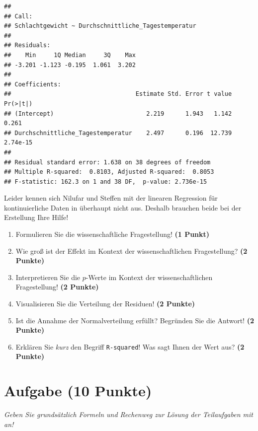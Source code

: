 \documentclass[a4paper, 9pt]{scrartcl}\usepackage[]{graphicx}\usepackage[]{xcolor}
\makeatletter
\newenvironment{kframe}{%
 \def\at@end@of@kframe{}%
 \ifinner\ifhmode%
  \def\at@end@of@kframe{\end{minipage}}%
  \begin{minipage}{\columnwidth}%
 \fi\fi%
 \def\FrameCommand##1{\hskip\@totalleftmargin \hskip-\fboxsep
 \colorbox{shadecolor}{##1}\hskip-\fboxsep
     \hskip-\linewidth \hskip-\@totalleftmargin \hskip\columnwidth}%
 \MakeFramed {\advance\hsize-\width
   \@totalleftmargin\z@ \linewidth\hsize
   \@setminipage}}%
 {\par\unskip\endMakeFramed%
 \at@end@of@kframe}
\newenvironment{knitrout}{}{} %
\makeatother
\begin{document}
\begin{knitrout}
\color{fgcolor}\begin{kframe}
\begin{verbatim}
## 
## Call:
## Schlachtgewicht ~ Durchschnittliche_Tagestemperatur
## 
## Residuals:
##    Min     1Q Median     3Q    Max 
## -3.201 -1.123 -0.195  1.061  3.202 
## 
## Coefficients:
##                                   Estimate Std. Error t value Pr(>|t|)
## (Intercept)                          2.219      1.943   1.142    0.261
## Durchschnittliche_Tagestemperatur    2.497      0.196  12.739 2.74e-15
## 
## Residual standard error: 1.638 on 38 degrees of freedom
## Multiple R-squared:  0.8103,	Adjusted R-squared:  0.8053 
## F-statistic: 162.3 on 1 and 38 DF,  p-value: 2.736e-15
\end{verbatim}
\end{kframe}
\end{knitrout}

Leider kennen sich Nilufar und Steffen mit der linearen Regression für kontinuierliche Daten in \Rlogo überhaupt nicht aus. Deshalb brauchen beide bei der Erstellung Ihre Hilfe!


\begin{enumerate}
\item Formulieren Sie die wissenschaftliche Fragestellung! \textbf{(1 Punkt)}
\item Wie groß ist der Effekt im Kontext der wissenschaftlichen Fragestellung? \textbf{(2 Punkte)} 
\item Interpretieren Sie die $p$-Werte im Kontext der wissenschaftlichen Fragestellung! \textbf{(2 Punkte)}
\item Visualisieren Sie die Verteilung der Residuen! \textbf{(2 Punkte)} 
\item Ist die Annahme der Normalverteilung erfüllt? Begründen Sie die Antwort! \textbf{(2 Punkte)}
\item Erklären Sie \textit{kurz} den Begriff \texttt{R-squared}! Was sagt Ihnen der Wert aus? \textbf{(2 Punkte)}
\end{enumerate}
 
\clearpage

\section{Aufgabe \hfill (10 Punkte)}

\textit{Geben Sie grundsätzlich Formeln und Rechenweg zur Lösung der Teilaufgaben mit an!} \\[1Ex]
 
\end{document}
